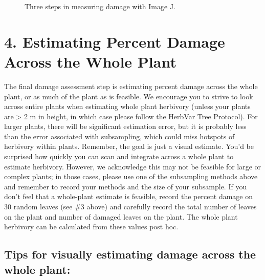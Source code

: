 \documentclass[
  letterpaper,
  oneside,
  open=any]{scrbook}
\begin{document}
\begin{figure}


\caption{\label{fig-imagej}Three steps in measuring damage with Image
J.}

\end{figure}%

\section{4. Estimating Percent Damage Across the Whole
Plant}\label{estimating-percent-damage-across-the-whole-plant}

The final damage assessment step is estimating percent damage across the
whole plant, or as much of the plant as is feasible. We encourage you to
strive to look across entire plants when estimating whole plant
herbivory (unless your plants are \textgreater{} 2 m in height, in which
case please follow the HerbVar Tree Protocol). For larger plants, there
will be significant estimation error, but it is probably less than the
error associated with subsampling, which could miss hotspots of
herbivory within plants. Remember, the goal is just a visual estimate.
You'd be surprised how quickly you can scan and integrate across a whole
plant to estimate herbivory. However, we acknowledge this may not be
feasible for large or complex plants; in those cases, please use one of
the subsampling methods above and remember to record your methods and
the size of your subsample. If you don't feel that a whole-plant
estimate is feasible, record the percent damage on 30 random leaves (see
\#3 above) and carefully record the total number of leaves on the plant
and number of damaged leaves on the plant. The whole plant herbivory can
be calculated from these values post hoc.

\subsection{Tips for visually estimating damage across the whole
plant:}\label{tips-for-visually-estimating-damage-across-the-whole-plant}
\end{document}
